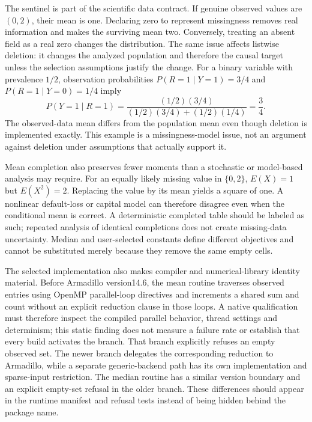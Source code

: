 The sentinel is part of the scientific data contract. If genuine observed values are $(0,2)$, their mean is one. Declaring zero to represent missingness removes real information and makes the surviving mean two. Conversely, treating an absent field as a real zero changes the distribution. The same issue affects listwise deletion: it changes the analyzed population and therefore the causal target unless the selection assumptions justify the change. For a binary variable with prevalence $1/2$, observation probabilities $P(R=1\mid Y=1)=3/4$ and $P(R=1\mid Y=0)=1/4$ imply
\[
 P(Y=1\mid R=1)=
 \frac{(1/2)(3/4)}{(1/2)(3/4)+(1/2)(1/4)}=\frac34.
\]
The observed-data mean differs from the population mean even though deletion is implemented exactly. This example is a missingness-model issue, not an argument against deletion under assumptions that actually support it.\citep{exec25_ctm_mlpack,exec25_ctm_choice}

Mean completion also preserves fewer moments than a stochastic or model-based analysis may require. For an equally likely missing value in $\{0,2\}$, $E(X)=1$ but $E(X^2)=2$. Replacing the value by its mean yields a square of one. A nonlinear default-loss or capital model can therefore disagree even when the conditional mean is correct. A deterministic completed table should be labeled as such; repeated analysis of identical completions does not create missing-data uncertainty. Median and user-selected constants define different objectives and cannot be substituted merely because they remove the same empty cells.\citep{exec25_ctm_choice}

The selected implementation also makes compiler and numerical-library identity material. Before Armadillo version14.6, the mean routine traverses observed entries using OpenMP parallel-loop directives and increments a shared sum and count without an explicit reduction clause in those loops. A native qualification must therefore inspect the compiled parallel behavior, thread settings and determinism; this static finding does not measure a failure rate or establish that every build activates the branch. That branch explicitly refuses an empty observed set. The newer branch delegates the corresponding reduction to Armadillo, while a separate generic-backend path has its own implementation and sparse-input restriction. The median routine has a similar version boundary and an explicit empty-set refusal in the older branch. These differences should appear in the runtime manifest and refusal tests instead of being hidden behind the package name.\citep{exec25_ctm_mlpack}

